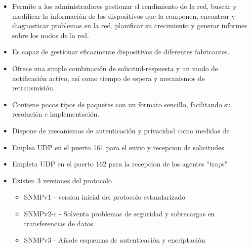\documentclass[letterpaper]{article}
\begin{document}
\begin{itemize}
  \item  Permite a los administradores gestionar el rendimiento de la red, buscar y
modificar la información de los dispositivos que la componen, encontrar y
diagnosticar problemas en la red, planificar su crecimiento y generar
informes sobre los nodos de la red.
  \item Es capaz de gestionar eficazmente dispositivos de diferentes fabricantes.

  \item Ofrece una simple combinación de solicitud-respuesta y un modo de
notificación activo, así como tiempo de espera y mecanismos de
retransmisión.

  \item Contiene pocos tipos de paquetes con un formato sencillo, facilitando su
resolución e implementación.
  \item Dispone de mecanismos de autenticación y privacidad como medidas de
  \item Emplea UDP en el puerto 161 para el envio y recepcion de solicitudes
  \item Empleta UDP en el puerto 162 para la recepcion de los agentes "traps"
  \item Existen 3 versiones del protocolo
  \begin{itemize}
    \item SNMPv1 - version inicial del protocolo estandarizado
    \item SNMPv2-c - Solventa problemas de seguridad y sobrecargas en transferencias de datos.
    \item SNMPv3 - Añade esquemas de autenticación y encriptación
  \end{itemize}
\end{itemize}
\end{document}
